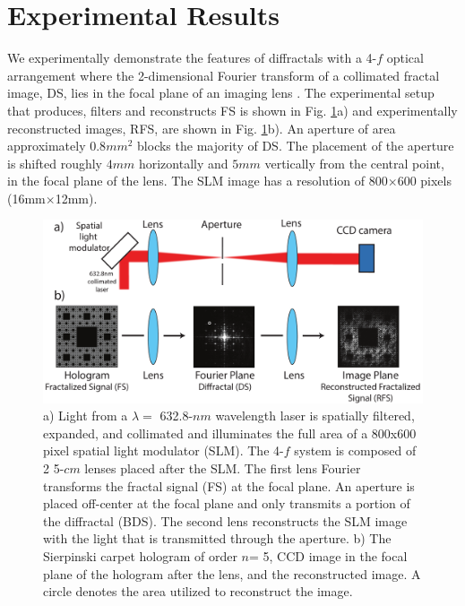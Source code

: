 
\section{Experimental Results} \label{experiment}
\indent We experimentally demonstrate the features of diffractals with a 4-$f$ optical arrangement where the 2-dimensional Fourier transform of a collimated fractal image, DS, lies in the focal plane of an imaging lens \cite{Goodman}.  The experimental setup that produces, filters and reconstructs FS is shown in Fig. \ref{ExpSetup}a) and experimentally reconstructed images, RFS, are shown in Fig. \ref{ExpSetup}b). An aperture of area approximately $0.8mm^2$ blocks the majority of DS. The placement of the aperture is shifted roughly $4mm$ horizontally and $5mm$ vertically from the central point, in the focal plane of the lens. The SLM image has a resolution of 800$\times$600 pixels (16mm$\times$12mm).  

\begin{figure}[t!]
\includegraphics[width=\textwidth]{ExpMethod.pdf}
\caption{a) Light from a $\lambda = $ 632.8-$nm$ wavelength laser is spatially filtered, expanded, and collimated and illuminates the full area of a 800x600 pixel spatial light modulator (SLM). The 4-$f$ system is composed of 2 5-$cm$ lenses placed after the SLM. The first lens Fourier transforms the fractal signal (FS) at the focal plane. An aperture is placed off-center at the focal plane and only transmits a portion of the diffractal (BDS). The second lens reconstructs the SLM image with the light that is transmitted through the aperture. b) The Sierpinski carpet hologram of order $n$= 5, CCD image in the focal plane of the hologram after the lens, and the reconstructed image. A circle denotes the area utilized to reconstruct the image.}
\label{ExpSetup}
\end{figure}


